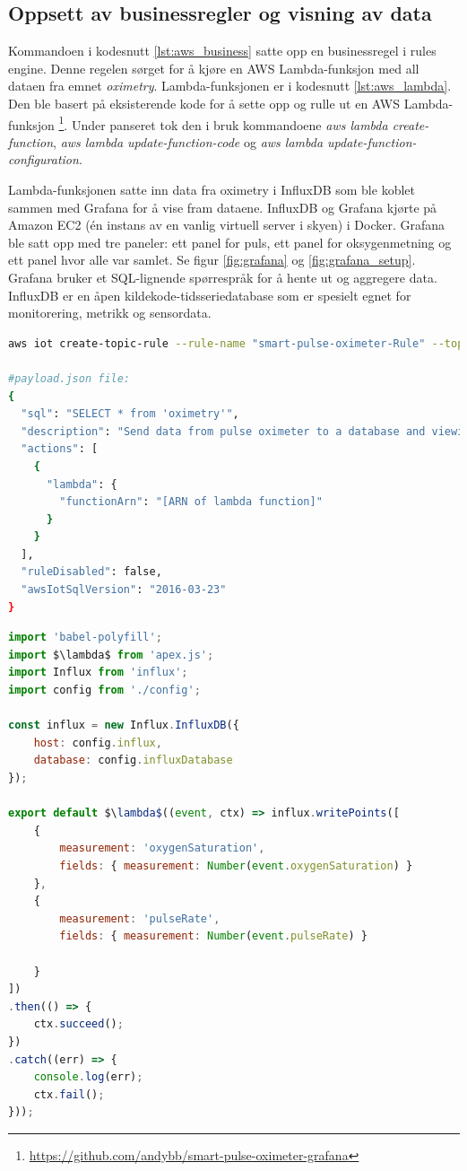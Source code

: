 \subsection{Oppsett av businessregler og visning av data}
Kommandoen i kodesnutt \ref{lst:aws_business} satte opp en businessregel i rules engine. Denne
regelen sørget for å kjøre en AWS Lambda-funksjon med all dataen fra emnet \textit{oximetry}. Lambda-funksjonen
er i kodesnutt \ref{lst:aws_lambda}. Den ble basert på eksisterende kode for å sette opp og rulle ut en
AWS Lambda-funksjon \footnote{\url{https://github.com/andybb/smart-pulse-oximeter-grafana}}. Under panseret
tok den i bruk kommandoene \textit{aws lambda create-function}, \textit{aws lambda update-function-code} og
\textit{aws lambda update-function-configuration}.

Lambda-funksjonen satte inn data fra oximetry i InfluxDB som ble koblet sammen med Grafana for å vise
fram dataene. InfluxDB og Grafana kjørte på Amazon EC2 (én instans av en vanlig virtuell server i skyen)
i Docker. Grafana ble satt opp med tre paneler: ett panel for puls, ett panel for oksygenmetning og
ett panel hvor alle var samlet. Se figur \ref{fig:grafana} og \ref{fig:grafana_setup}. Grafana bruker et SQL-lignende
spørrespråk for å hente ut og aggregere data. InfluxDB er en åpen kildekode-tidsseriedatabase som er spesielt egnet for
monitorering, metrikk og sensordata.

\begin{lstlisting}[frame=single, language=bash, caption=Sette opp en businessregel i AWS IoT, label=lst:aws_business]
aws iot create-topic-rule --rule-name "smart-pulse-oximeter-Rule" --topic-rule-payload "file://payload.json" 

#payload.json file:
{
  "sql": "SELECT * from 'oximetry'",
  "description": "Send data from pulse oximeter to a database and viewing tool",
  "actions": [
    {
      "lambda": {
        "functionArn": "[ARN of lambda function]"
      }
    }
  ],
  "ruleDisabled": false,
  "awsIotSqlVersion": "2016-03-23"
}
\end{lstlisting}

\begin{lstlisting}[language=JavaScript, frame=single,
caption=AWS Lambda-funksjon for å sette dataen inn i en database, label=lst:aws_lambda, mathescape=true]
import 'babel-polyfill';
import $\lambda$ from 'apex.js';
import Influx from 'influx';
import config from './config';

const influx = new Influx.InfluxDB({
    host: config.influx,
    database: config.influxDatabase
});

export default $\lambda$((event, ctx) => influx.writePoints([
    {
        measurement: 'oxygenSaturation',
        fields: { measurement: Number(event.oxygenSaturation) }
    },
    {
        measurement: 'pulseRate',
        fields: { measurement: Number(event.pulseRate) }

    }
])
.then(() => {
    ctx.succeed();
})
.catch((err) => {
    console.log(err);
    ctx.fail();
}));
\end{lstlisting}

